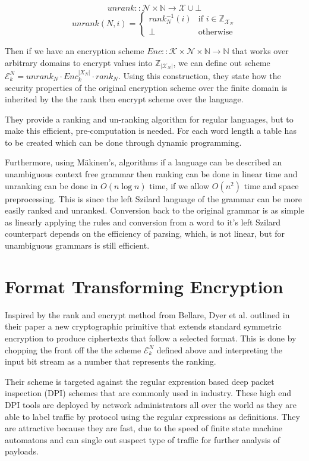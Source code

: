 \documentclass[10pt,a4paper]{article}
\begin{document}
$$ unrank :: \mathcal{N} \times \mathbb{N} \rightarrow \mathcal{X} \cup \bot $$
$$ unrank(N,i) =
\left\{
	\begin{array}{ll}
		rank_N^{-1}(i)  & \mbox{if } i \in \mathbb{Z}_{\mathcal{X}_N}\\
		\bot & \mbox{otherwise} 
	\end{array}
\right.
$$

Then if we have an encryption scheme $Enc :: \mathcal{K} \times \mathcal{N} \times \mathbb{N} \rightarrow \mathbb{N}$ that works over arbitrary domains to encrypt values into $\mathbb{Z}_{|\mathcal{X}_N|}$, we can define out scheme $\mathcal{E}_k^N = unrank_N \cdot Enc_k^{|X_N|} \cdot rank_N$. Using this construction, they state how the security properties of the original encryption scheme over the finite domain is inherited by the the rank then encrypt scheme over the language.

They provide a ranking and un-ranking algorithm for regular languages, but to make this efficient, pre-computation is needed. For each word length a table has to be created which can be done through dynamic programming.

Furthermore, using M\"akinen's\cite{rankcf}, algorithms if a language can be described an unambiguous context free grammar then ranking can be done in linear time and unranking can be done in $O(n \log n)$ time, if we allow $O(n^2)$ time and space preprocessing. This is since the left Szilard language of the grammar can be more easily ranked and unranked. Conversion back to the original grammar is as simple as linearly applying the rules and conversion from a word to it's left Szilard counterpart depends on the efficiency of parsing, which, is not linear, but for unambiguous grammars is still efficient.

\section{Format Transforming Encryption}

Inspired by the rank and encrypt method from Bellare, Dyer et al. outlined in their paper\cite{fte} a new cryptographic primitive that extends standard symmetric encryption to produce ciphertexts that follow a selected format. This is done by chopping the front off the the scheme $\mathcal{E}^N_k$ defined above and interpreting the input bit stream as a number that represents the ranking.

Their scheme is targeted against the regular expression based deep packet inspection (DPI) schemes that are commonly used in industry. These high end DPI tools are deployed by network administrators all over the world as they are able to label traffic by protocol using the regular expressions as definitions. They are attractive because they are fast, due to the speed of finite state machine automatons and can single out suspect type of traffic for further analysis of payloads.
\end{document}
